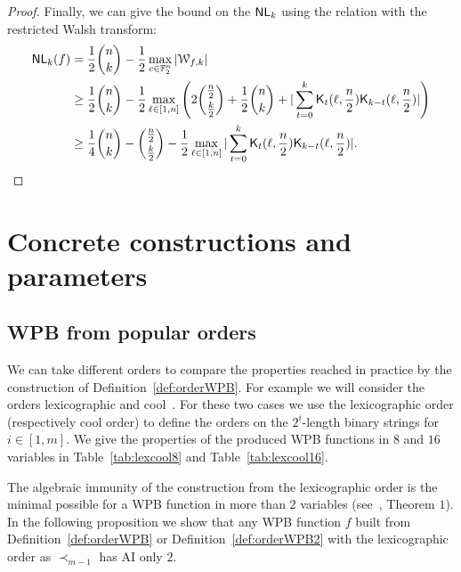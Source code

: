 \documentclass[11pt]{llncs}
\begin{document}
\begin{proof}
Finally, we can give the bound on the $\mathsf{NL}_{k}$ using the relation with the restricted Walsh transform:
\begin{align*}
\mathsf{NL}_{k}(f)&= \frac{1}{2} \binom{n}{k} - \frac{1}{2}\max_{c \in \mathbb{F}_2^n} |\mathcal{W}_{f,k}|\\
&\ge \frac{1}{2} \binom{n}{k} - \frac{1}{2}\max_{\ell \in [1,n]} \left( 2\binom{\frac{n}{2}}{\frac{k}{2}}+ \frac{1}{2} \binom{n}{k}+ |\sum_{t=0}^{k} \mathsf{K}_{t}(\ell,\frac{n}{2}) \mathsf{K}_{k-t}(\ell,\frac{n}{2})| \right)\\
&\ge \frac{1}{4} \binom{n}{k} - \binom{\frac{n}{2}}{\frac{k}{2}} - \frac{1}{2}   \max_{\ell \in [1,n]} |\sum_{t=0}^{k} \mathsf{K}_{t}(\ell,\frac{n}{2}) \mathsf{K}_{k-t}(\ell,\frac{n}{2}) |.
\end{align*}
	
	
\end{proof}




\section{Concrete constructions and parameters}\label{sec:concrete}

\subsection{WPB from popular orders}



We can take different orders to compare the properties reached in practice by the construction of Definition~\ref{def:orderWPB}. For example we will consider the orders lexicographic and cool~\cite{FUN:SteWil12}. 
For these two cases we use the lexicographic order (respectively cool order) to define the orders on the $2^i$-length binary strings for $i\in [1,m]$. We give the properties of the produced WPB functions in $8$ and $16$ variables in Table~\ref{tab:lexcool8} and Table~\ref{tab:lexcool16}. 



The algebraic immunity of the construction from the lexicographic order is the minimal possible for a WPB function in more than $2$ variables (see~\cite{Latin:GinMea23}, Theorem $1$). In the following proposition we show that any WPB function $f$ built from Definition~\ref{def:orderWPB} or Definition~\ref{def:orderWPB2} with the lexicographic order as $\prec_{m-1}$ has AI only $2$.
\end{document}
